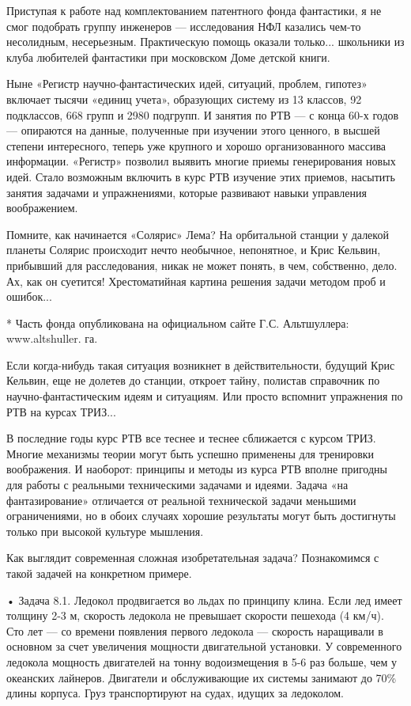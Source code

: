Приступая к работе над  комплектованием патентного фонда фантастики, я
не  смог  подобрать  группу  инженеров  —  исследования  НФЛ  казались
чем-то несолидным, несерьезным.  Практическую помощь оказали только...
школьники из  клуба любителей  фантастики при московском  Доме детской
книги.

Ныне «Регистр научно-фантастических  идей, ситуаций, проблем, гипотез»
включает тысячи «единиц  учета», образующих систему из  13 классов, 92
подклассов, 668  групп и  2980 подгрупп.  И занятия по  РТВ —  с конца
60-х  годов  — опираются  на  данные,  полученные при  изучении  этого
ценного, в  высшей степени интересного,  теперь уже крупного  и хорошо
организованного массива информации.  «Регистр» позволил выявить многие
приемы генерирования новых  идей. Стало возможным включить  в курс РТВ
изучение  этих  приемов,  насытить занятия  задачами  и  упражнениями,
которые развивают навыки управления воображением.

Помните,  как  начинается «Солярис»  Лема?  На  орбитальной станции  у
далекой планеты Солярис происходит нечто необычное, непонятное, и Крис
Кельвин, прибывший  для расследования, никак  не может понять,  в чем,
собственно, дело. Ах, как  он суетится! Хрестоматийная картина решения
задачи методом проб и ошибок...

*  Часть фонда  опубликована  на официальном  сайте Г.С.  Альтшуллера:
www.altshuller. га.


Если когда-нибудь такая ситуация возникнет в действительности, будущий
Крис  Кельвин, еще  не  долетев до  станции,  откроет тайну,  полистав
справочник  по научно-фантастическим  идеям  и  ситуациям. Или  просто
вспомнит упражнения по РТВ на курсах ТРИЗ...

В последние  годы курс  РТВ все  теснее и  теснее сближается  с курсом
ТРИЗ.  Многие  механизмы  теории  могут  быть  успешно  применены  для
тренировки воображения.  И наоборот:  принципы и  методы из  курса РТВ
вполне пригодны для работы с реальными техническими задачами и идеями.
Задача «на  фантазирование» отличается от реальной  технической задачи
меньшими ограничениями,  но в  обоих случаях хорошие  результаты могут
быть достигнуты только при высокой культуре мышления.




Как выглядит современная  сложная изобретательная задача? Познакомимся
с такой задачей на конкретном примере.

•  Задача  8.1.  Ледокол  продвигается во  льдах  по  принципу  клина.
Если  лед  имеет  толщину  2-3   м,  скорость  ледокола  не  превышает
скорости пешехода  (4 км/ч).  Сто лет —  со времени  появления первого
ледокола — скорость наращивали в  основном за счет увеличения мощности
двигательной установки. У современного ледокола мощность двигателей на
тонну  водоизмещения  в 5-6  раз  больше,  чем у  океанских  лайнеров.
Двигатели и  обслуживающие их системы  занимают до 70\%  длины корпуса.
Груз транспортируют на судах, идущих за ледоколом.

